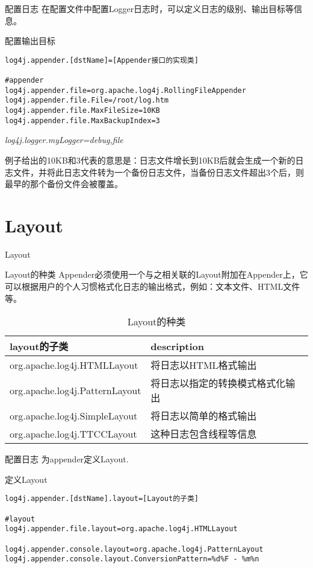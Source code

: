 \documentclass{beamer}
\begin{document}
\begin{frame}[fragile]{配置日志}
在配置文件中配置Logger日志时，可以定义日志的级别、输出目标等信息。
\begin{block}{配置输出目标}
\begin{verbatim}
log4j.appender.[dstName]=[Appender接口的实现类]

#appender
log4j.appender.file=org.apache.log4j.RollingFileAppender
log4j.appender.file.File=/root/log.htm
log4j.appender.file.MaxFileSize=10KB
log4j.appender.file.MaxBackupIndex=3
\end{verbatim}
\emph{log4j.logger.myLogger=debug,file}
\end{block}
例子给出的10KB和3代表的意思是：日志文件增长到10KB后就会生成一个新的日志文件，并将此日志文件转为一个备份日志文件，当备份日志文件超出3个后，则最早的那个备份文件会被覆盖。
\end{frame}

\section{Layout}
\begin{frame}
\Huge{\centerline{Layout}}
\end{frame}
\begin{frame}{Layout的种类}
Appender必须使用一个与之相关联的Layout附加在Appender上，它可以根据用户的个人习惯格式化日志的输出格式，例如：文本文件、HTML文件等。
\begin{table}
\begin{tabular}{ll}
\toprule
\textbf{layout的子类}&\textbf{description}\\
\midrule
org.apache.log4j.HTMLLayout&将日志以HTML格式输出\\
org.apache.log4j.PatternLayout&将日志以指定的转换模式格式化输出\\
org.apache.log4j.SimpleLayout&将日志以简单的格式输出\\
org.apache.log4j.TTCCLayout&这种日志包含线程等信息\\
\bottomrule
\end{tabular}
\caption{Layout的种类}
\label{layout}
\end{table}
\end{frame}
\begin{frame}[fragile]{配置日志}
为appender定义Layout.
\begin{block}{定义Layout}
\begin{verbatim}
log4j.appender.[dstName].layout=[Layout的子类]

#layout
log4j.appender.file.layout=org.apache.log4j.HTMLLayout

log4j.appender.console.layout=org.apache.log4j.PatternLayout
log4j.appender.console.layout.ConversionPattern=%d%F - %m%n
\end{verbatim}
\end{block}
\end{frame}
\end{document}

